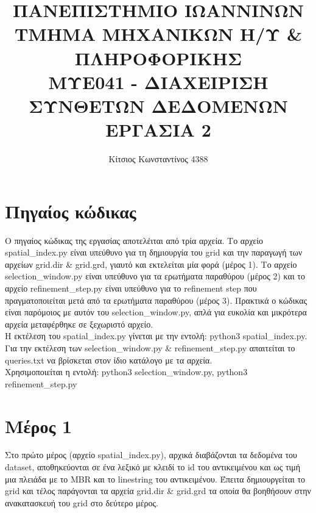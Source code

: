 \documentclass{article}[40pt]
\title{ΠΑΝΕΠΙΣΤΗΜΙΟ ΙΩΑΝΝΙΝΩΝ \\ ΤΜΗΜΑ ΜΗΧΑΝΙΚΩΝ Η/Υ  \&  ΠΛΗΡΟΦΟΡΙΚΗΣ \\  ΜΥΕ041 - ΔΙΑΧΕΙΡΙΣΗ ΣΥΝΘΕΤΩΝ ΔΕΔΟΜΕΝΩΝ \\ ΕΡΓΑΣΙΑ 2}
\author{Κίτσιος Κωνσταντίνος 4388 }
\begin{document}
\maketitle
\newpage
\tableofcontents
\newpage
\section{Πηγαίος κώδικας}
Ο πηγαίος κώδικας της εργασίας αποτελέιται από τρία αρχεία. Το αρχείο spatial\_index.py είναι υπεύθυνο για τη δημιουργία του grid και την παραγωγή των αρχείων grid.dir \& grid.grd, γιαυτό και εκτελείται μία φορά (μέρος 1). Το αρχείο selection\_window.py είναι υπεύθυνο για τα ερωτήματα παραθύρου (μέρος 2) και το αρχείο refinement\_step.py είναι υπεύθυνο για το refinement step που πραγματοποιείται μετά από τα ερωτήματα παραθύρου (μέρος 3). Πρακτικά ο κώδικας είναι παρόμοιος με αυτόν του selection\_window.py, απλά για ευκολία και μικρότερα αρχεία μεταφέρθηκε σε ξεχωριστό αρχείο.\\
Η εκτέλεση του spatial\_index.py γίνεται με την εντολή: python3 spatial\_index.py.\\
Για την εκτέλεση των selection\_window.py \& refinement\_step.py απαιτείται το queries.txt να βρίσκεται στον ίδιο κατάλογο με τα αρχεία.\\
Χρησιμοποιείται η εντολή: python3 selection\_window.py, python3 refinement\_step.py
\newpage
\section{Μέρος 1}
Στο πρώτο μέρος (αρχείο spatial\_index.py), αρχικά διαβάζονται τα δεδομένα του dataset, αποθηκεύονται σε ένα λεξικό με κλειδί το id του αντικειμένου και ως τιμή μια πλειάδα με το MBR και το linestring του αντικειμένου. Έπειτα δημιουργείται το grid και τέλος παράγονται τα αρχεία grid.dir \& grid.grd τα οποία θα βοηθήσουν στην ανακατασκευή του grid στο δεύτερο μέρος.
\end{document}
